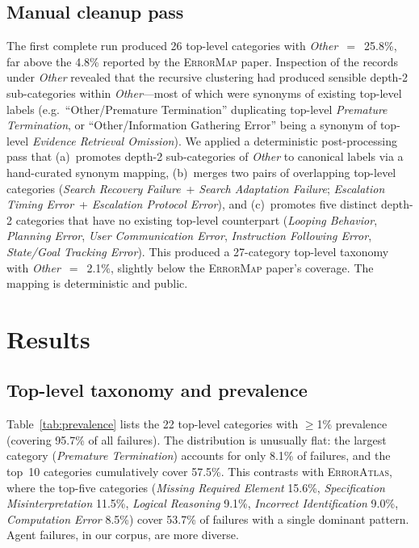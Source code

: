 \documentclass[11pt]{article}
\begin{document}
\subsection{Manual cleanup pass}

The first complete run produced 26 top-level categories with
\emph{Other}~$=$~25.8\%, far above the 4.8\% reported by the
\textsc{ErrorMap} paper. Inspection of the records under
\emph{Other} revealed that the recursive clustering had produced
sensible depth-2 sub-categories within \emph{Other}---most of which
were synonyms of existing top-level labels (e.g.\ ``Other/Premature
Termination'' duplicating top-level \emph{Premature Termination}, or
``Other/Information Gathering Error'' being a synonym of top-level
\emph{Evidence Retrieval Omission}). We applied a deterministic
post-processing pass that (a)~promotes depth-2 sub-categories of
\emph{Other} to canonical labels via a hand-curated synonym
mapping, (b)~merges two pairs of overlapping top-level categories
(\emph{Search Recovery Failure}~+ \emph{Search Adaptation Failure};
\emph{Escalation Timing Error}~+ \emph{Escalation Protocol Error}),
and (c)~promotes five distinct depth-2 categories that have no
existing top-level counterpart (\emph{Looping Behavior},
\emph{Planning Error}, \emph{User Communication Error},
\emph{Instruction Following Error},
\emph{State/Goal Tracking Error}). This produced a 27-category
top-level taxonomy with \emph{Other}~$=$~2.1\%, slightly below the
\textsc{ErrorMap} paper's coverage. The mapping is deterministic
and public.

\section{Results}

\subsection{Top-level taxonomy and prevalence}

Table~\ref{tab:prevalence} lists the 22 top-level categories with
$\geq$1\% prevalence (covering 95.7\% of all failures). The
distribution is unusually flat: the largest category
(\emph{Premature Termination}) accounts for only 8.1\% of failures,
and the top~10 categories cumulatively cover 57.5\%. This contrasts
with \textsc{ErrorAtlas}, where the top-five categories
(\emph{Missing Required Element} 15.6\%, \emph{Specification
Misinterpretation} 11.5\%, \emph{Logical Reasoning} 9.1\%,
\emph{Incorrect Identification} 9.0\%, \emph{Computation Error}
8.5\%) cover 53.7\% of failures with a single dominant pattern.
Agent failures, in our corpus, are more diverse.
\end{document}
